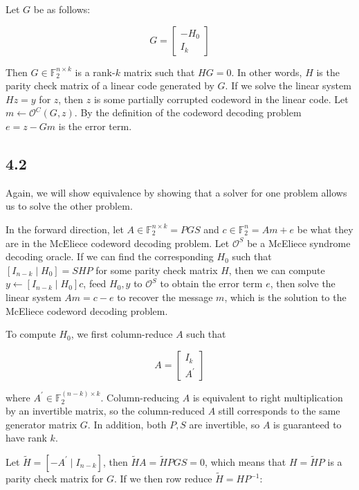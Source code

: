\documentclass{article}
\begin{document}
Let $G$ be as follows:

\begin{equation*}
    G = \begin{bmatrix}
        -H_0 \\ I_k
    \end{bmatrix}
\end{equation*}

Then $G \in \mathbb{F}_2^{n \times k}$ is a rank-$k$ matrix such that $HG = 0$. In other words, $H$ is the parity check matrix of a linear code generated by $G$. If we solve the linear system $Hz = y$ for $z$, then $z$ is some partially corrupted codeword in the linear code. Let $m \leftarrow \mathcal{O}^C(G, z)$. By the definition of the codeword decoding problem $e = z - Gm$ is the error term.

\subsection*{4.2}
Again, we will show equivalence by showing that a solver for one problem allows us to solve the other problem.

In the forward direction, let $A \in \mathbb{F}_2^{n \times k} = PGS$ and $c \in \mathbb{F}_2^n = Am + e$ be what they are in the McEliece codeword decoding problem. Let $\mathcal{O}^S$ be a McEliece syndrome decoding oracle. If we can find the corresponding $H_0$ such that $[I_{n-k} \mid H_0] = SHP$ for some parity check matrix $H$, then we can compute $y \leftarrow [I_{n-k} \mid H_0]c$, feed $H_0, y$ to $\mathcal{O}^S$ to obtain the error term $e$, then solve the linear system $Am = c - e$ to recover the message $m$, which is the solution to the McEliece codeword decoding problem.

To compute $H_0$, we first column-reduce $A$ such that

$$
A = \begin{bmatrix}
    I_k \\ A^\prime
\end{bmatrix}
$$

where $A^\prime \in \mathbb{F}_2^{(n-k) \times k}$. Column-reducing $A$ is equivalent to right multiplication by an invertible matrix, so the column-reduced $A$ still corresponds to the same generator matrix $G$. In addition, both $P, S$ are invertible, so $A$ is guaranteed to have rank $k$.

Let $\tilde{H} = [-A^\prime \mid I_{n-k}]$, then $\tilde{H}A = \tilde{H}PGS = 0$, which means that $H = \tilde{H}P$ is a parity check matrix for $G$. If we then row reduce $\tilde{H} = HP^{-1}$:
\end{document}
